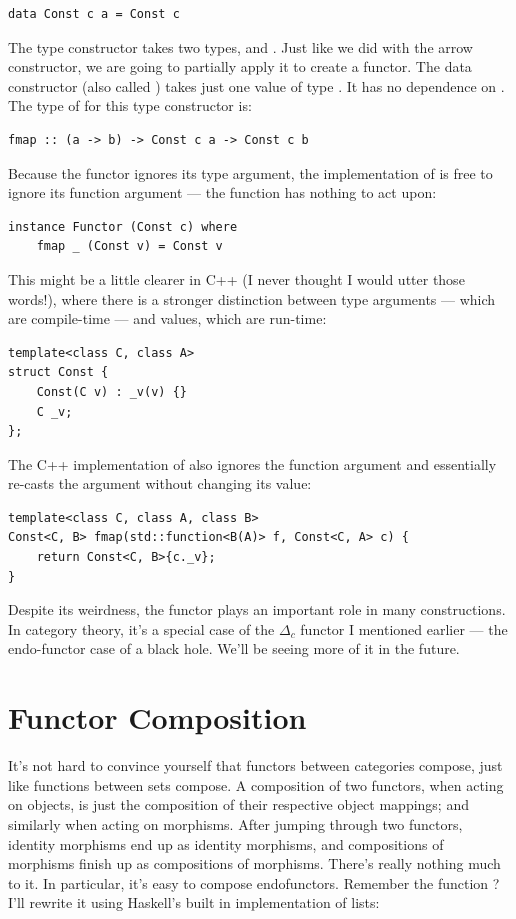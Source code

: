 \begin{Verbatim}
data Const c a = Const c
\end{Verbatim}
The  type constructor takes two types,  and
. Just like we did with the arrow constructor, we are going to
partially apply it to create a functor. The data constructor (also
called ) takes just one value of type . It has
no dependence on . The type of  for this type
constructor is:

\begin{Verbatim}
fmap :: (a -> b) -> Const c a -> Const c b
\end{Verbatim}
Because the functor ignores its type argument, the implementation of
 is free to ignore its function argument --- the function
has nothing to act upon:

\begin{Verbatim}
instance Functor (Const c) where
    fmap _ (Const v) = Const v
\end{Verbatim}
This might be a little clearer in C++ (I never thought I would utter
those words!), where there is a stronger distinction between type
arguments --- which are compile-time --- and values, which are run-time:

\begin{Verbatim}
template<class C, class A>
struct Const { 
    Const(C v) : _v(v) {}
    C _v;
};
\end{Verbatim}
The C++ implementation of  also ignores the function
argument and essentially re-casts the  argument without
changing its value:

\begin{Verbatim}
template<class C, class A, class B>
Const<C, B> fmap(std::function<B(A)> f, Const<C, A> c) {
    return Const<C, B>{c._v};
}
\end{Verbatim}
Despite its weirdness, the  functor plays an important
role in many constructions. In category theory, it's a special case of
the $\Delta_c$ functor I mentioned earlier --- the endo-functor
case of a black hole. We'll be seeing more of it in the future.

\section{Functor Composition}

It's not hard to convince yourself that functors between categories
compose, just like functions between sets compose. A composition of two
functors, when acting on objects, is just the composition of their
respective object mappings; and similarly when acting on morphisms.
After jumping through two functors, identity morphisms end up as
identity morphisms, and compositions of morphisms finish up as
compositions of morphisms. There's really nothing much to it. In
particular, it's easy to compose endofunctors. Remember the function
? I'll rewrite it using Haskell's built in
implementation of lists:

